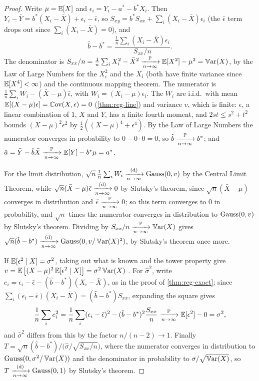 \begin{proof}
Write $\mu = \operatorname*{\mathbb{E}}[X]$ and $\epsilon_i = Y_i - a^* - b^*X_i$.
Then $Y_i - \bar{Y} = b^*(X_i - \bar{X}) + \epsilon_i - \bar{\epsilon}$, so $S_{xy} = b^*S_{xx} + \sum_i (X_i - \bar{X})\epsilon_i$ (the $\bar{\epsilon}$ term drops out since $\sum_i (X_i - \bar{X}) = 0$), and
\[
\hat{b} - b^* = \frac{\frac1n\sum_i (X_i - \bar{X})\epsilon_i}{S_{xx}/n}.
\]
The denominator is $S_{xx}/n = \frac1n\sum_i X_i^2 - \bar{X}^2 \xrightarrow [n \to \infty ]{\mathbb{P}} \operatorname*{\mathbb{E}}[X^2] - \mu^2 = \operatorname*{\mathbb{V}\text{ar}}(X)$, by the Law of Large Numbers for the $X_i^2$ and the $X_i$ (both have finite variance since $\operatorname*{\mathbb{E}}[X^4] < \infty$) and the continuous mapping theorem.
The numerator is $\frac1n\sum_i W_i - (\bar{X} - \mu)\bar{\epsilon}$, with $W_i = (X_i - \mu)\epsilon_i$.
The $W_i$ are i.i.d.\ with mean $\operatorname*{\mathbb{E}}[(X - \mu)\epsilon] = \operatorname*{\mathbb{C}\text{ov}}(X, \epsilon) = 0$ (\cref{thm:reg-line}) and variance $v$, which is finite: $\epsilon$, a linear combination of $1$, $X$ and $Y$, has a finite fourth moment, and $2st \leq s^2 + t^2$ bounds $(X - \mu)^2\epsilon^2$ by $\frac12((X - \mu)^4 + \epsilon^4)$.
By the Law of Large Numbers the numerator converges in probability to $0 - 0 \cdot 0 = 0$, so $\hat{b} \xrightarrow [n \to \infty ]{\mathbb{P}} b^*$; and $\hat{a} = \bar{Y} - \hat{b}\bar{X} \xrightarrow [n \to \infty ]{\mathbb{P}} \operatorname*{\mathbb{E}}[Y] - b^*\mu = a^*$.

For the limit distribution, $\sqrt{n}\,\frac1n\sum_i W_i \xrightarrow [n \to \infty ]{\text{(d)}} \text{Gauss}(0, v)$ by the Central Limit Theorem, while $\sqrt{n}(\bar{X} - \mu)\bar{\epsilon} \xrightarrow [n \to \infty ]{\text{(d)}} 0$ by Slutsky's theorem, since $\sqrt{n}(\bar{X} - \mu)$ converges in distribution and $\bar{\epsilon} \xrightarrow [n \to \infty ]{\mathbb{P}} 0$; so this term converges to $0$ in probability, and $\sqrt{n}$ times the numerator converges in distribution to $\text{Gauss}(0, v)$ by Slutsky's theorem.
Dividing by $S_{xx}/n \xrightarrow [n \to \infty ]{\mathbb{P}} \operatorname*{\mathbb{V}\text{ar}}(X)$ gives $\sqrt{n}(\hat{b} - b^*) \xrightarrow [n \to \infty ]{\text{(d)}} \text{Gauss}(0, v/\operatorname*{\mathbb{V}\text{ar}}(X)^2)$, by Slutsky's theorem once more.

If $\operatorname*{\mathbb{E}}[\epsilon^2 \mid X] = \sigma^2$, taking out what is known and the tower property give $v = \operatorname*{\mathbb{E}}\big[(X - \mu)^2\operatorname*{\mathbb{E}}[\epsilon^2 \mid X]\big] = \sigma^2\operatorname*{\mathbb{V}\text{ar}}(X)$ .
For $\hat{\sigma}^2$, write $e_i = \epsilon_i - \bar{\epsilon} - (\hat{b} - b^*)(X_i - \bar{X})$, as in the proof of \cref{thm:reg-exact}; since $\sum_i (\epsilon_i - \bar{\epsilon})(X_i - \bar{X}) = (\hat{b} - b^*)S_{xx}$, expanding the square gives
\[
\frac1n\sum_i e_i^2 = \frac1n\sum_i (\epsilon_i - \bar{\epsilon})^2 - (\hat{b} - b^*)^2\frac{S_{xx}}{n} \xrightarrow [n \to \infty ]{\mathbb{P}} \operatorname*{\mathbb{E}}[\epsilon^2] - 0 = \sigma^2,
\]
and $\hat{\sigma}^2$ differs from this by the factor $n/(n - 2) \to 1$.
Finally $T = \sqrt{n}(\hat{b} - b^*)\big/\big(\hat{\sigma}/\sqrt{S_{xx}/n}\big)$, where the numerator converges in distribution to $\text{Gauss}(0, \sigma^2/\operatorname*{\mathbb{V}\text{ar}}(X))$ and the denominator in probability to $\sigma/\sqrt{\operatorname*{\mathbb{V}\text{ar}}(X)}$, so $T \xrightarrow [n \to \infty ]{\text{(d)}} \text{Gauss}(0, 1)$ by Slutsky's theorem.
\end{proof}

